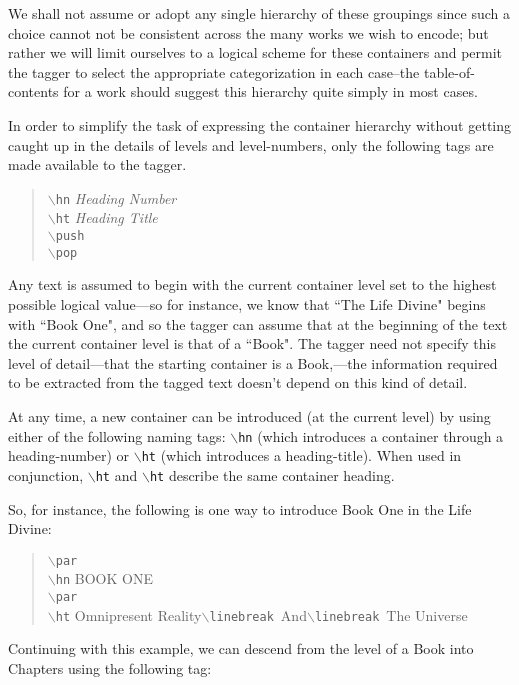 \documentclass[11pt]{article}
\newcommand{\cmd}[1]{{\tt $\backslash$#1}}
\begin{document}
We shall not assume or adopt any single hierarchy of these groupings
since such a choice cannot not be consistent across the many works we
wish to encode; but rather we will limit ourselves to a logical scheme
for these containers and permit the tagger to select the appropriate
categorization in each case--the table-of-contents for a work should
suggest this hierarchy quite simply in most cases.

In order to simplify the task of expressing the container hierarchy
without getting caught up in the details of levels and level-numbers,
only the following tags are made available to the tagger.

\begin{quote}
  \cmd{hn} \emph{Heading Number}\\
  \cmd{ht} \emph{Heading Title}\\
  \cmd{push}\\
  \cmd{pop}\\
\end{quote}

Any text is assumed to begin with the current container level set to
the highest possible logical value---so for instance, we know that
``The Life Divine" begins with ``Book One", and so the tagger can
assume that at the beginning of the text the current container level
is that of a ``Book". The tagger need not specify this level of
detail---that the starting container is a Book,---the information
required to be extracted from the tagged text doesn't depend on this
kind of detail.

At any time, a new container can be introduced (at the current level)
by using either of the following naming tags: \cmd{hn} (which
introduces a container through a heading-number) or \cmd{ht} (which
introduces a heading-title). When used in conjunction, \cmd{ht} and
\cmd{ht} describe the same container heading.

So, for instance, the following is one way to introduce Book One in
the Life Divine:

\begin{quote}
  \cmd{par}\\
  \cmd{hn} BOOK ONE\\
  \cmd{par}\\
  \cmd{ht} Omnipresent Reality\cmd{linebreak}\ And\cmd{linebreak}\  The Universe
\end{quote}

\noindent Continuing with this example, we can descend from the level of a Book
into Chapters using the following tag:
\end{document}

